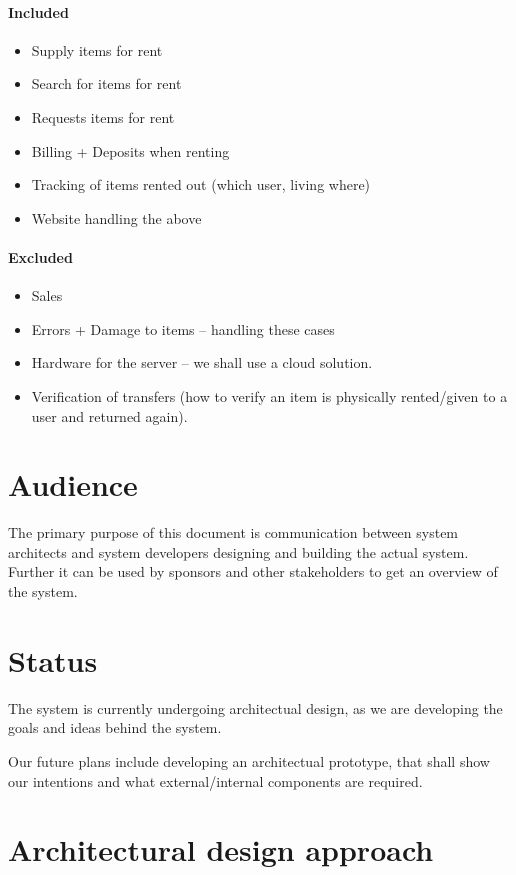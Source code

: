 \documentclass[a4paper,11pt]{report}
\begin{document}
\paragraph{Included}
\begin{itemize}
\item Supply items for rent
\item Search for items for rent
\item Requests items for rent
\item Billing + Deposits when renting
\item Tracking of items rented out (which user, living where)
\item Website handling the above
\end{itemize}

\paragraph{Excluded}
\begin{itemize}
\item Sales
\item Errors + Damage to items -- handling these cases
\item Hardware for the server -- we shall use a cloud solution.
\item Verification of transfers (how to verify an item is physically rented/given to a user and returned again).
\end{itemize}

\section{Audience}
\label{sec:audience}
The primary purpose of this document is communication between system architects
and system developers designing and building the actual system.
Further it can be used by sponsors and other stakeholders to get an overview of
the system.

\section{Status}
\label{sec:status}
The system is currently undergoing architectual design, as we are developing
the goals and ideas behind the system.

Our future plans include developing an architectual prototype, that shall show
our intentions and what external/internal components are required.

\section{Architectural design approach}
\label{sec:arch-design-appr}
\end{document}
